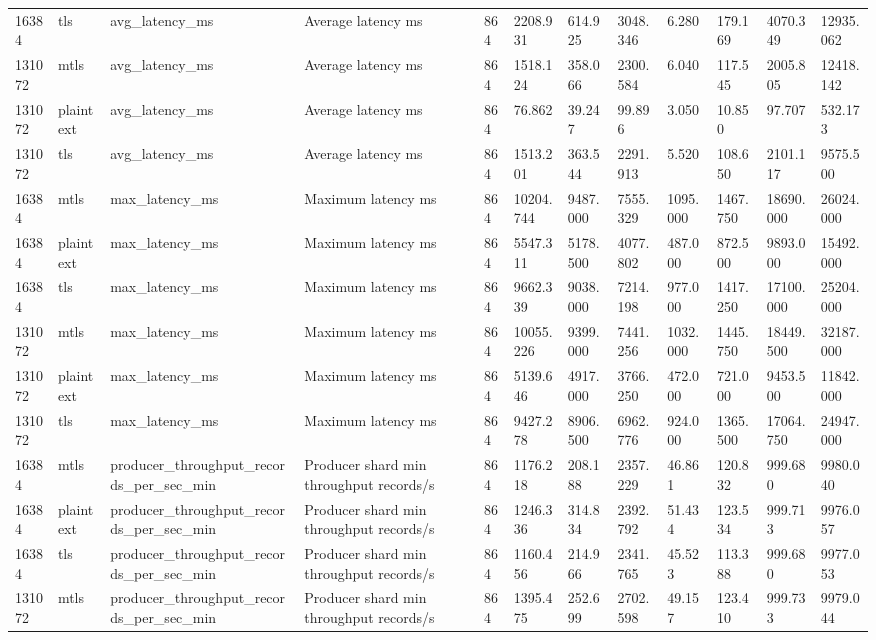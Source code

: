 \begin{longtable}{llllllllllll}
16384 & tls & avg\_latency\_ms & Average latency ms & 864 & 2208.931 & 614.925 & 3048.346 & 6.280 & 179.169 & 4070.349 & 12935.062 \\
131072 & mtls & avg\_latency\_ms & Average latency ms & 864 & 1518.124 & 358.066 & 2300.584 & 6.040 & 117.545 & 2005.805 & 12418.142 \\
131072 & plaintext & avg\_latency\_ms & Average latency ms & 864 & 76.862 & 39.247 & 99.896 & 3.050 & 10.850 & 97.707 & 532.173 \\
131072 & tls & avg\_latency\_ms & Average latency ms & 864 & 1513.201 & 363.544 & 2291.913 & 5.520 & 108.650 & 2101.117 & 9575.500 \\
16384 & mtls & max\_latency\_ms & Maximum latency ms & 864 & 10204.744 & 9487.000 & 7555.329 & 1095.000 & 1467.750 & 18690.000 & 26024.000 \\
16384 & plaintext & max\_latency\_ms & Maximum latency ms & 864 & 5547.311 & 5178.500 & 4077.802 & 487.000 & 872.500 & 9893.000 & 15492.000 \\
16384 & tls & max\_latency\_ms & Maximum latency ms & 864 & 9662.339 & 9038.000 & 7214.198 & 977.000 & 1417.250 & 17100.000 & 25204.000 \\
131072 & mtls & max\_latency\_ms & Maximum latency ms & 864 & 10055.226 & 9399.000 & 7441.256 & 1032.000 & 1445.750 & 18449.500 & 32187.000 \\
131072 & plaintext & max\_latency\_ms & Maximum latency ms & 864 & 5139.646 & 4917.000 & 3766.250 & 472.000 & 721.000 & 9453.500 & 11842.000 \\
131072 & tls & max\_latency\_ms & Maximum latency ms & 864 & 9427.278 & 8906.500 & 6962.776 & 924.000 & 1365.500 & 17064.750 & 24947.000 \\
16384 & mtls & producer\_throughput\_records\_per\_sec\_min & Producer shard min throughput records/s & 864 & 1176.218 & 208.188 & 2357.229 & 46.861 & 120.832 & 999.680 & 9980.040 \\
16384 & plaintext & producer\_throughput\_records\_per\_sec\_min & Producer shard min throughput records/s & 864 & 1246.336 & 314.834 & 2392.792 & 51.434 & 123.534 & 999.713 & 9976.057 \\
16384 & tls & producer\_throughput\_records\_per\_sec\_min & Producer shard min throughput records/s & 864 & 1160.456 & 214.966 & 2341.765 & 45.523 & 113.388 & 999.680 & 9977.053 \\
131072 & mtls & producer\_throughput\_records\_per\_sec\_min & Producer shard min throughput records/s & 864 & 1395.475 & 252.699 & 2702.598 & 49.157 & 123.410 & 999.733 & 9979.044 \\

\end{longtable}
